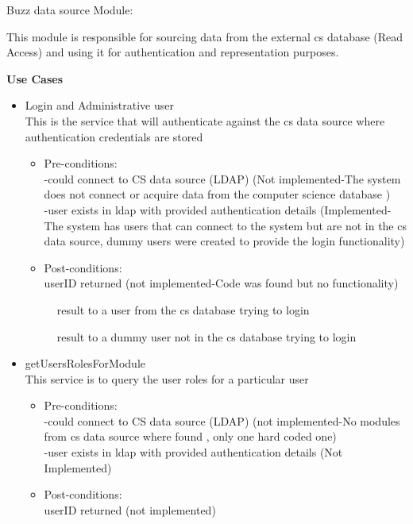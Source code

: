 \item Buzz data source Module:

This module is responsible for sourcing data from the external cs database (Read Access) and using it for authentication and representation purposes.


\textbf{Use Cases}
\begin {itemize}


\item {Login and Administrative user}\\
This is the service that will authenticate against the cs data source where authentication credentials are stored

\begin {itemize}
\item Pre-conditions:\\
-could connect to CS data source (LDAP) (Not implemented-The system does not connect or acquire data from the 			computer science database )\\
        -user exists in ldap with provided authentication details (Implemented-The system has users that can connect to the system but are not 		in the cs data source, dummy users were created to provide the login 				functionality)\\
\item Post-conditions:\\
userID returned (not implemented-Code was found but no functionality)  
\end {itemize}

 
\begin{figure}[h!]
  \centering
  \caption{result to a user from the cs database trying to login }
\end{figure}


\begin{figure}[h!]
  \centering
  \caption{result to a dummy user not in the cs database trying to login }
\end{figure}

 
\item {getUsersRolesForModule}\\
This service is to query the user roles for a particular user\\


\begin {itemize}
\item Pre-conditions:\\
-could connect to CS data source (LDAP) (not implemented-No modules from cs data source where found , only one 			hard coded one)\\
        -user exists in ldap with provided authentication details (Not Implemented)\\
\item Post-conditions:\\
userID returned (not implemented)  
\end {itemize}



\end{itemize}
